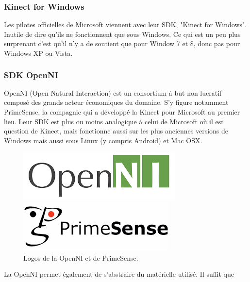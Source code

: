 \documentclass[french,12pt]{report}
\begin{document}
  \subsubsection{Kinect for Windows}  
  Les pilotes officielles de Microsoft viennent avec leur SDK, "Kinect for 
  Windows". Inutile de dire
  qu'ils ne fonctionnent que sous Windows. Ce qui est un peu plus surprenant 
  c'est qu'il n'y a de soutient que pour Window 7 et 8, donc pas pour Windows XP 
  ou Vista.
  \subsubsection{SDK OpenNI}
  OpenNI (Open Natural Interaction) est un consortium à but non lucratif composé
  des grands acteur économiques du domaine. S'y figure notamment PrimeSense, la 
  compagnie qui a développé la Kinect pour Microsoft au premier lieu. Leur SDK
  est plus ou moins analogique à celui de Microsoft où il est question de
  Kinect, mais fonctionne aussi sur les plus anciennes 
  versions de Windows mais
  aussi sous Linux (y compris Android) et Mac OSX.
  \begin{figure}[h!]
  \begin{minipage}{0.49\linewidth}
    \centering
    \includegraphics[width=0.9\linewidth]{images/openni_logo}
  \end{minipage}
  \begin{minipage}{0.49\linewidth}
    \centering
    \includegraphics[width=0.9\linewidth]{images/primesense_logo}
  \end{minipage}
  
  \caption{Logos de la OpenNI et de PrimeSense.}
  \end{figure}
  La OpenNI permet également de s'abstraire du matérielle utilisé. Il suffit que
\end{document}
